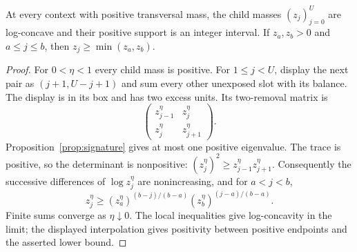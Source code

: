 \begin{lemma}\label{lem:child-logconcavity}
At every context with positive transversal mass, the child masses
$(z_j)_{j=0}^U$ are log-concave and their positive support is an integer
interval.  If $z_a,z_b>0$ and $a\le j\le b$, then
$z_j\ge\min(z_a,z_b)$.
\end{lemma}
\begin{proof}
For $0<\eta<1$ every child mass is positive.  For $1\le j<U$, display
the next pair as $(j+1,U-j+1)$ and sum every other unexposed slot with its
balance.  The display is in its box and has two excess units.  Its
two-removal matrix is
\[
 \begin{pmatrix}z_{j-1}^\eta&z_j^\eta\\
                 z_j^\eta&z_{j+1}^\eta\end{pmatrix}.
\]
Proposition~\ref{prop:signature} gives at most one positive eigenvalue.
The trace is positive, so the determinant is nonpositive:
$(z_j^\eta)^2\ge z_{j-1}^\eta z_{j+1}^\eta$.
Consequently the successive differences of $\log z_j^\eta$ are
nonincreasing, and for $a<j<b$,
\[
 z_j^\eta\ge
 (z_a^\eta)^{(b-j)/(b-a)}(z_b^\eta)^{(j-a)/(b-a)}.
\]
Finite sums converge as $\eta\downarrow0$.  The local inequalities give
log-concavity in the limit; the displayed interpolation gives positivity
between positive endpoints and the asserted lower bound.
\end{proof}

